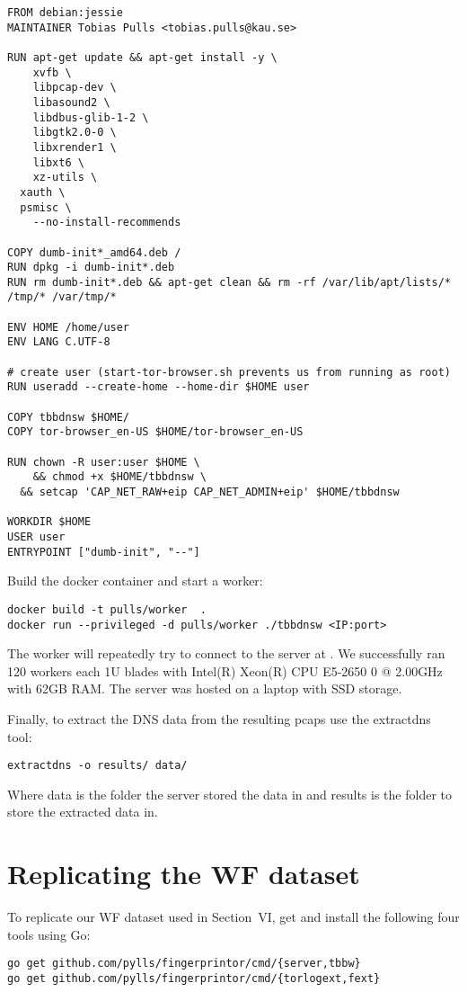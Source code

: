 \documentclass{article}
\begin{document}
\begin{lstlisting}
FROM debian:jessie
MAINTAINER Tobias Pulls <tobias.pulls@kau.se>

RUN apt-get update && apt-get install -y \
	xvfb \
	libpcap-dev \
	libasound2 \
	libdbus-glib-1-2 \
	libgtk2.0-0 \
	libxrender1 \
	libxt6 \
	xz-utils \
  xauth \
  psmisc \
	--no-install-recommends

COPY dumb-init*_amd64.deb /
RUN dpkg -i dumb-init*.deb
RUN rm dumb-init*.deb && apt-get clean && rm -rf /var/lib/apt/lists/* /tmp/* /var/tmp/*

ENV HOME /home/user
ENV LANG C.UTF-8

# create user (start-tor-browser.sh prevents us from running as root)
RUN useradd --create-home --home-dir $HOME user

COPY tbbdnsw $HOME/
COPY tor-browser_en-US $HOME/tor-browser_en-US

RUN chown -R user:user $HOME \
	&& chmod +x $HOME/tbbdnsw \
  && setcap 'CAP_NET_RAW+eip CAP_NET_ADMIN+eip' $HOME/tbbdnsw

WORKDIR $HOME
USER user
ENTRYPOINT ["dumb-init", "--"]
\end{lstlisting}

Build the docker container and start a worker:

\begin{lstlisting}
docker build -t pulls/worker  .
docker run --privileged -d pulls/worker ./tbbdnsw <IP:port>
\end{lstlisting}
The worker will repeatedly try to connect to the server at {\tt <IP:port>}. We
successfully ran 120 workers each 1U blades with Intel(R) Xeon(R) CPU E5-2650 0
@ 2.00GHz with 62GB RAM. The server was hosted on a laptop with SSD storage.

Finally, to extract the DNS data from the resulting pcaps use the
extractdns tool:

\begin{lstlisting}
extractdns -o results/ data/
\end{lstlisting}
Where data is the folder the server stored the data in and results is the folder
to store the extracted data in.

\section{Replicating the WF dataset}
To replicate our WF dataset used in Section~VI, get and install the following
four tools using Go:
\begin{lstlisting}
go get github.com/pylls/fingerprintor/cmd/{server,tbbw}
go get github.com/pylls/fingerprintor/cmd/{torlogext,fext}
\end{lstlisting}
\end{document}
